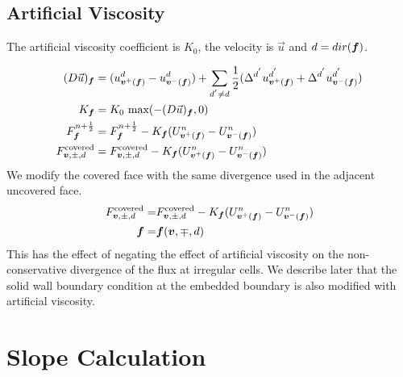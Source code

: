\subsection{Artificial Viscosity} 

The artificial viscosity coefficient
is $K_0$, the velocity is $\vec u$ and $d = dir({\boldsymbol{f}})$.

\begin{align*}
(D \vec u)_{\boldsymbol{f}} &= (u^d_{{\boldsymbol{v}}^+ ({\boldsymbol{f}})}-u^d_{{\boldsymbol{v}}^-({\boldsymbol{f}})}) +
\sum_{{d^{'}}\neq d } \frac{1}{2}(\Delta^{d^{'}} u^{d^{'}}_{{\boldsymbol{v}}^+({\boldsymbol{f}})}
+ \Delta^{d^{'}}u^{d^{'}}_{{\boldsymbol{v}}^-({\boldsymbol{f}})}) \\
K_{\boldsymbol{f}} &= K_0~\text{max}(-(D\vec u)_{\boldsymbol{f}}, 0)  \\
F^{n+\frac{1}{2}}_{{\boldsymbol{f}}} &=  F^{n+\frac{1}{2}}_{{\boldsymbol{f}}} 
- K_{\boldsymbol{f}}(U^n_{{\boldsymbol{v}}^+({\boldsymbol{f}})} - U^n_{{\boldsymbol{v}}^-({\boldsymbol{f}})})  \\
F^{\text{covered}}_{{\boldsymbol{v}}, \pm, d} &= F^{\text{covered}}_{{\boldsymbol{v}}, \pm, d}-
K_{\boldsymbol{f}}(U^n_{{\boldsymbol{v}}^+({\boldsymbol{f}})} -U^n_{{\boldsymbol{v}}^-({\boldsymbol{f}})}) 
\end{align*}
We modify the covered face with  the same divergence used
in the adjacent uncovered face.
\begin{align*}
F^{\text{covered}}_{{\boldsymbol{v}}, \pm, d} =&
F^{\text{covered}}_{{\boldsymbol{v}},\pm, d} -
K_{\boldsymbol{f}}(U^n_{{\boldsymbol{v}}^+({\boldsymbol{f}})} -U^n_{{\boldsymbol{v}}^-({\boldsymbol{f}})}) \\
{\boldsymbol{f}} =& {\boldsymbol{f}}({\boldsymbol{v}},\mp, d) 
\end{align*}
This has the effect of negating the effect of artificial viscosity 
on the non-conservative divergence of the flux at irregular cells.
We describe later that the solid wall boundary condition at the
embedded boundary is also modified with artificial viscosity.

\section{Slope Calculation} \label{sec::slopeCalculation}

